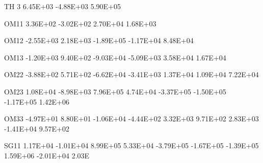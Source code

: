\documentclass[
  11pt,
  krantz2,
  a4paper]{krantz}
\newenvironment{Shaded}{\begin{snugshade}}{\end{snugshade}}
\newcommand{\DecValTok}[1]{\textcolor[rgb]{0.00,0.00,0.81}{#1}}
\newcommand{\FloatTok}[1]{\textcolor[rgb]{0.00,0.00,0.81}{#1}}
\newcommand{\NormalTok}[1]{#1}
\theoremstyle{definition}
\theoremstyle{definition}
\theoremstyle{definition}
\theoremstyle{remark}
\begin{document}
\begin{Shaded}
\begin{Highlighting}[]
\NormalTok{TH }\DecValTok{3}    \FloatTok{6.45E+03} \FloatTok{{-}4.88E+03}  \FloatTok{5.90E+05}                                                                   
                                                                                                       
\NormalTok{OM11    }\FloatTok{3.36E+02} \FloatTok{{-}3.02E+02}  \FloatTok{2.70E+04}  \FloatTok{1.68E+03}                                                         
                                                                                                       
\NormalTok{OM12   }\FloatTok{{-}2.55E+03}  \FloatTok{2.18E+03} \FloatTok{{-}1.89E+05} \FloatTok{{-}1.17E+04}  \FloatTok{8.48E+04}                                               
                                                                                                       
\NormalTok{OM13   }\FloatTok{{-}1.20E+03}  \FloatTok{9.40E+02} \FloatTok{{-}9.03E+04} \FloatTok{{-}5.09E+03}  \FloatTok{3.58E+04}  \FloatTok{1.67E+04}                                     
                                                                                                       
\NormalTok{OM22   }\FloatTok{{-}3.88E+02}  \FloatTok{5.71E+02} \FloatTok{{-}6.62E+04} \FloatTok{{-}3.41E+03}  \FloatTok{1.37E+04}  \FloatTok{1.09E+04}  \FloatTok{7.22E+04}                           
                                                                                                       
\NormalTok{OM23    }\FloatTok{1.08E+04} \FloatTok{{-}8.98E+03}  \FloatTok{7.96E+05}  \FloatTok{4.74E+04} \FloatTok{{-}3.37E+05} \FloatTok{{-}1.50E+05} \FloatTok{{-}1.17E+05}  \FloatTok{1.42E+06}                 
                                                                                                       
\NormalTok{OM33   }\FloatTok{{-}4.97E+01}  \FloatTok{8.80E+01} \FloatTok{{-}1.06E+04} \FloatTok{{-}4.44E+02}  \FloatTok{3.32E+03}  \FloatTok{9.71E+02}  \FloatTok{2.83E+03} \FloatTok{{-}1.41E+04}  \FloatTok{9.57E+02}       
                                                                                                       
\NormalTok{SG11    }\FloatTok{1.17E+04} \FloatTok{{-}1.01E+04}  \FloatTok{8.99E+05}  \FloatTok{5.33E+04} \FloatTok{{-}3.79E+05} \FloatTok{{-}1.67E+05} \FloatTok{{-}1.39E+05}  \FloatTok{1.59E+06} \FloatTok{{-}2.01E+04}  \FloatTok{2.03}\NormalTok{E}
                                                                                                       

\end{Highlighting}
\end{Shaded}
\end{document}
